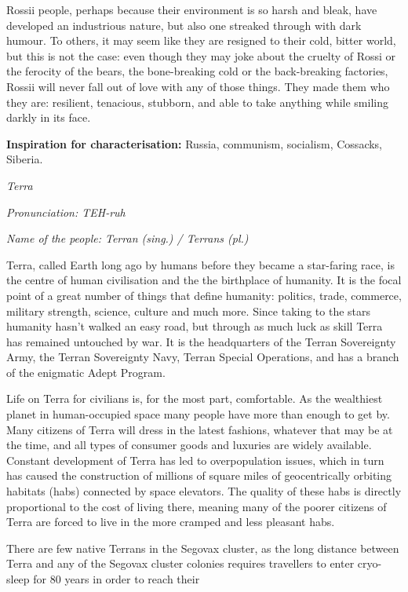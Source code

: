 \documentclass{scrbook}
\begin{document}
Rossii people, perhaps because their environment is so harsh and bleak, have developed an industrious nature, but also one streaked through with dark humour. To others, it may seem like they are resigned to their cold, bitter world, but this is not the case: even though they may joke about the cruelty of Rossi or the ferocity of the bears, the bone-breaking cold or the back-breaking factories, Rossii will never fall out of love with any of those things. They made them who they are: resilient, tenacious, stubborn, and able to take anything while smiling darkly in its face.

\textbf{Inspiration for characterisation:} Russia, communism, socialism, Cossacks, Siberia.

\textit{Terra}

\textit{Pronunciation: TEH-ruh}

\textit{Name of the people: Terran (sing.) / Terrans (pl.)}

Terra, called Earth long ago by humans before they became a star-faring race, is the centre of human civilisation and the the birthplace of humanity. It is the focal point of a great number of things that define humanity: politics, trade, commerce, military strength, science, culture and much more. Since taking to the stars humanity hasn't walked an easy road, but through as much luck as skill Terra has remained untouched by war. It is the headquarters of the Terran Sovereignty Army, the Terran Sovereignty Navy, Terran Special Operations, and has a branch of the enigmatic Adept Program.

Life on Terra for civilians is, for the most part, comfortable. As the wealthiest planet in human-occupied space many people have more than enough to get by. Many citizens of Terra will dress in the latest fashions, whatever that may be at the time, and all types of consumer goods and luxuries are widely available. Constant development of Terra has led to overpopulation issues, which in turn has caused the construction of millions of square miles of geocentrically orbiting habitats (habs) connected by space elevators. The quality of these habs is directly proportional to the cost of living there, meaning many of the poorer citizens of Terra are forced to live in the more cramped and less pleasant habs.

There are few native Terrans in the Segovax cluster, as the long distance between Terra and any of the Segovax cluster colonies requires travellers to enter cryo-sleep for 80 years in order to reach their
\end{document}
